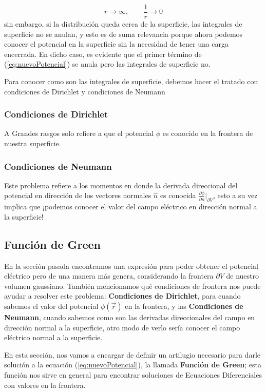 \documentclass[11pt,a4paper]{article}
\begin{document}
$$r\to\infty,\qquad\frac{1}{r}\to0$$
sin embargo, si la distribución queda cerca de la superficie, las integrales de superficie no se anulan, y esto es de suma relevancia porque ahora podemos conocer el potencial en la superficie sin la necesidad de tener una carga encerrada. En dicho caso, es evidente que el primer término de (\ref{eq:nuevoPotencial}) se anula pero las integrales de superficie no.

Para conocer como son las integrales de superficie, debemos hacer el tratado con condiciones de Dirichlet y condiciones de Neumann

\subsubsection*{Condiciones de Dirichlet}

A Grandes rasgos solo refiere a que el potencial $\phi$ es conocido en la frontera de nuestra superficie.

\subsubsection*{Condiciones de Neumann}

Este problema refiere a los momentos en donde la derivada direccional del potencial en dirección de los vectores normales $\hat{n}$ es conocida $\frac{\partial\phi}{\partial n}\big |_{\partial V}$, esto a su vez implica que ¡podemos conocer el valor del campo eléctrico en dirección normal a la superficie!

\subsection{Función de Green}
En la sección pasada encontramos una expresión para poder obtener el potencial eléctrico pero de una manera más genera, considerando la frontera $\partial V$ de nuestro volumen gaussiano. También mencionamos qué condiciones de frontera nos puede ayudar a resolver este problema: \textbf{Condiciones de Dirichlet}, para cuando sabemos el valor del potencial $\phi(\vec{r})$ en la frontera, y las \textbf{Condiciones de Neumann}, cuando sabemos como son las derivadas direccionales del campo en dirección normal a la superficie, otro modo de verlo sería conocer el campo eléctrico normal a la superficie.

En esta sección, nos vamos a encargar de definir un artilugio necesario para darle solución a la ecuación (\ref{eq:nuevoPotencial}), la llamada \textbf{Función de Green}; esta función nos sirve en general para encontrar soluciones de Ecuaciones Diferenciales con valores en la frontera.
\end{document}
